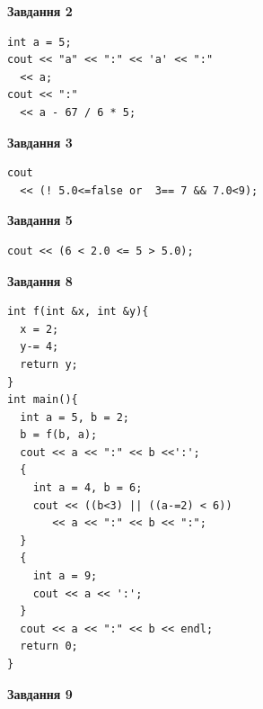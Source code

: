 \documentclass[12pt, ukrainian]{article}
\begin{document}
{\begin {large}
\begin{minipage}[t]{7.0cm}
\end{minipage}
\vline \hspace{1mm}
\begin{minipage}[t]{11.0cm}

\begin{center}
\textbf{Завдання 2}
\end{center}
\vspace{-8mm}

\begin{verbatim}
int a = 5;
cout << "a" << ":" << 'a' << ":" 
  << a;
cout << ":" 
  << a - 67 / 6 * 5;
\end{verbatim}



\begin{center}
\textbf{Завдання 3}
\end{center}
\vspace{-8mm}

\begin{verbatim}
cout 
  << (! 5.0<=false or  3== 7 && 7.0<9);
\end{verbatim}



\begin{center}
\textbf{Завдання 5}
\end{center}
\vspace{-8mm}

\begin{verbatim}
cout << (6 < 2.0 <= 5 > 5.0);
\end{verbatim}



\begin{center}
\textbf{Завдання 8}
\end{center}
\vspace{-8mm}

\begin{verbatim}
int f(int &x, int &y){
  x = 2;
  y-= 4;
  return y;
}
int main(){
  int a = 5, b = 2;
  b = f(b, a);
  cout << a << ":" << b <<':';
  {
    int a = 4, b = 6;
    cout << ((b<3) || ((a-=2) < 6))
       << a << ":" << b << ":";
  }
  {
    int a = 9;
    cout << a << ':';
  }
  cout << a << ":" << b << endl;
  return 0;
}
\end{verbatim}

\end{minipage}


\begin{minipage}[t]{7.0cm}

\begin{center}
\textbf{Завдання 9}
\end{center}
\vspace{-8mm}


\end{minipage}
\end{large}}
\end{document}
